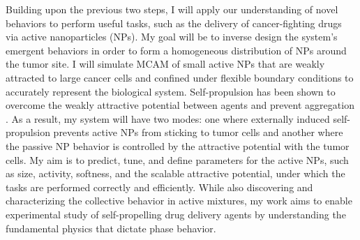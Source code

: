 \documentclass[11pt]{article}
\begin{document}
Building upon the previous two steps, I will apply our understanding of novel behaviors to perform useful tasks, such as the delivery of cancer-fighting drugs via active nanoparticles (NPs). My goal will be to inverse design the system’s emergent behaviors in order to form a homogeneous distribution of NPs around the tumor site. I will simulate MCAM of small active NPs that are weakly attracted to large cancer cells and confined under flexible boundary conditions to accurately represent the biological system. Self-propulsion has been shown to overcome the weakly attractive potential between agents and prevent aggregation \cite{Redner}. As a result, my system will have two modes: one where externally induced self-propulsion \cite{Palacci} prevents active NPs from sticking to tumor cells and another where the passive NP behavior is controlled by the attractive potential with the tumor cells.  My aim is to predict, tune, and define parameters for the active NPs, such as size, activity, softness, and the scalable attractive potential, under which the tasks are performed correctly and efficiently.  While also discovering and characterizing the collective behavior in active mixtures, my work aims to enable experimental study of self-propelling drug delivery agents by understanding the fundamental physics that dictate phase behavior. 
\end{document}
